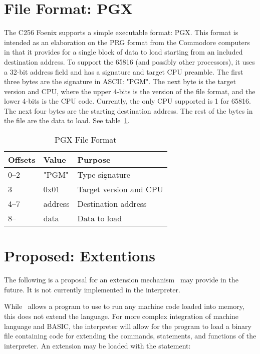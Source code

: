 \documentclass{report}
\begin{document}
    \section*{File Format: PGX}

    The C256 Foenix supports a simple executable format: PGX.
    This format is intended as an elaboration on the PRG format from the Commodore computers
    in that it provides for a single block of data to load starting from an included destination
    address. To support the 65816 (and possibly other processors), it uses a 32-bit address field and
    has a signature and target CPU preamble. The first three bytes are the signature in ASCII: "PGM".
    The next byte is the target version and CPU, where the upper 4-bits is the version of the file format, 
    and the lower 4-bits is the CPU code. Currently, the only CPU supported is 1 for 65816.
    The next four bytes are the starting destination address. The rest of the bytes in the file are the
    data to load. See table~\ref{pgx}.

    \begin{table}[!htb]
        \begin{center}
            \begin{tabular}{|l|l|l|} \hline
                Offsets & Value &  Purpose \\ \hline\hline
                0--2 & "PGM" & Type signature \\ \hline
                3 & 0x01 & Target version and CPU \\ \hline
                4--7 & address & Destination address \\ \hline
                8-- & data & Data to load \\ \hline
            \end{tabular}
        \end{center}
        \caption{PGX File Format}
        \label{pgx}
    \end{table}

    \section*{Proposed: Extentions}

    The following is a proposal for an extension mechanism \BASIC\ may provide in the future.
    It is not currently implemented in the interpreter.

    While \BASIC\ allows a program to use  to run any machine code loaded into memory,
    this does not extend the language.
    For more complex integration of machine language and BASIC, the interpreter will allow for
    the program to load a binary file containing code for extending the commands, statements,
    and functions of the interpreter. An extension may be loaded with the statement:
\end{document}
